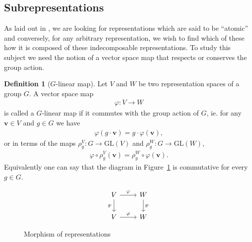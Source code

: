 \documentclass[12pt, a4paper, twoside]{article}
\theoremstyle{definition}
\newtheorem{definition}{Definition}[section]
\theoremstyle{remark}
\numberwithin{equation}{section}
\newcommand{\1}{\mathbf{1}}
\newcommand{\0}{\mathbf{0}}
\newcommand{\GL}{\text{GL}}
\newcommand{\vvec}{\mathbf{v}}
\begin{document}





\clearpage{\thispagestyle{empty}\cleardoublepage}
{\hypersetup{linkcolor=black}
\tableofcontents
}

%





\subsection{Subrepresentations}

	As laid out in \cite{FultonHarris}, we are looking for representations which are said to be ``atomic'' and conversely, for any arbitrary representation, we wish to find which of these how it is composed of these indecomposable representations. To study this subject we need the notion of a vector space map that respects or conserves the group action.	
	

	\begin{definition}[$G$-linear map]\cite{FultonHarris}
		Let $V$ and $W$ be two representation spaces of a group $G$. A vector space map 
		\begin{align*}
			\varphi: V \rightarrow W
		\end{align*} 
		is called a $G$-linear map if it commutes with the group action of $G$, ie. for any $\vvec \in V$ and $g \in G$ we have
		\begin{align*}
			\varphi( g \cdot \vvec ) = g \cdot \varphi (\vvec),
		\end{align*}
		or in terms of the maps $\rho_g^V: G \rightarrow \GL(V)$ and $\rho_g^W: G \rightarrow \GL(W)$,
		\begin{align*}
			\varphi \circ \rho^V_g (\vvec) = \rho^W_g \circ \varphi (\vvec).
		\end{align*}
		Equivalently one can say that the diagram in Figure~\ref*{fig:commapmorp} is commutative for every $g \in G$.
		\begin{figure}[hbt!]
			\centering
			\[\begin{tikzcd}
				V \arrow{r}{\varphi} \arrow[swap]{d}{g \cdot} & W \arrow{d}{g \cdot} \\
				V \arrow{r}{\varphi} & W
			\end{tikzcd}\]
			\caption{Morphism of representations}
			\label{fig:commapmorp}
		\end{figure}
	\end{definition}
	
\end{document}
